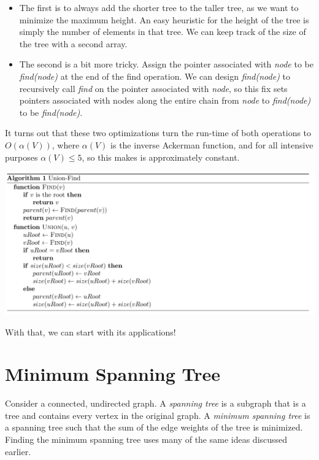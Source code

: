 \documentclass[11pt]{article}
\begin{document}
    \begin{itemize}
        \item The first is to always add the shorter tree to the taller tree, as we want to minimize the maximum height. An easy heuristic for the height of the tree is simply the number of elements in that tree. We can keep track of the size of the tree with a second array.
        \item The second is a bit more tricky. Assign the pointer associated with \textit{node} to be \textit{find(node)} at the end of the find operation. We can design \textit{find(node)} to recursively call \textit{find} on the pointer associated with \textit{node}, so this fix sets pointers associated with nodes along the entire chain from \textit{node} to \textit{find(node)} to be \textit{find(node)}. 
    \end{itemize}
    
    It turns out that these two optimizations turn the run-time of both operations to $O(\alpha(V))$, where $\alpha(V)$ is the inverse Ackerman function, and for all intensive purposes $\alpha(V) \leq 5$, so this makes is approximately constant. 
    
    \includegraphics[]{images/UFind.PNG}
    
    With that, we can start with its applications!

\section{Minimum Spanning Tree}

    Consider a connected, undirected graph. A \textit{spanning tree} is a subgraph that is a tree and contains every vertex in the original graph. A \textit{minimum spanning tree} is a spanning tree such that the sum of the edge weights of the tree is minimized. Finding the minimum spanning tree uses many of the same ideas discussed earlier.
    
\end{document}
